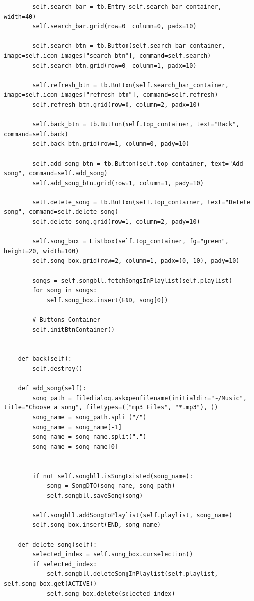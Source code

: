 \documentclass[a4paper]{article}
\begin{document}
\begin{mdframed}[hidealllines=true,backgroundcolor=magenta!10]
\begin{lstlisting}
        self.search_bar = tb.Entry(self.search_bar_container, width=40)
        self.search_bar.grid(row=0, column=0, padx=10)

        self.search_btn = tb.Button(self.search_bar_container, image=self.icon_images["search-btn"], command=self.search)
        self.search_btn.grid(row=0, column=1, padx=10)

        self.refresh_btn = tb.Button(self.search_bar_container, image=self.icon_images["refresh-btn"], command=self.refresh)
        self.refresh_btn.grid(row=0, column=2, padx=10)

        self.back_btn = tb.Button(self.top_container, text="Back", command=self.back)
        self.back_btn.grid(row=1, column=0, pady=10)

        self.add_song_btn = tb.Button(self.top_container, text="Add song", command=self.add_song)
        self.add_song_btn.grid(row=1, column=1, pady=10)

        self.delete_song = tb.Button(self.top_container, text="Delete song", command=self.delete_song)
        self.delete_song.grid(row=1, column=2, pady=10)

        self.song_box = Listbox(self.top_container, fg="green", height=20, width=100)
        self.song_box.grid(row=2, column=1, padx=(0, 10), pady=10)

        songs = self.songbll.fetchSongsInPlaylist(self.playlist)
        for song in songs:
            self.song_box.insert(END, song[0])

        # Buttons Container
        self.initBtnContainer()


    def back(self):
        self.destroy()

    def add_song(self):
        song_path = filedialog.askopenfilename(initialdir="~/Music", title="Choose a song", filetypes=(("mp3 Files", "*.mp3"), ))
        song_name = song_path.split("/")
        song_name = song_name[-1]
        song_name = song_name.split(".")
        song_name = song_name[0]


        if not self.songbll.isSongExisted(song_name):
            song = SongDTO(song_name, song_path)
            self.songbll.saveSong(song)

        self.songbll.addSongToPlaylist(self.playlist, song_name)
        self.song_box.insert(END, song_name)

    def delete_song(self):
        selected_index = self.song_box.curselection()
        if selected_index:
            self.songbll.deleteSongInPlaylist(self.playlist, self.song_box.get(ACTIVE))
            self.song_box.delete(selected_index)


\end{lstlisting}
\end{mdframed}
\end{document}
